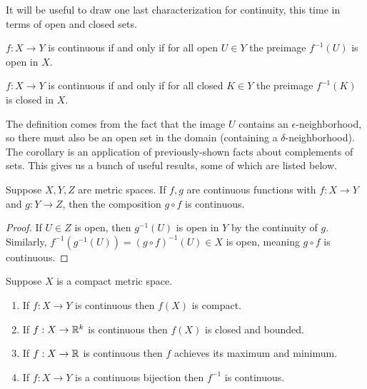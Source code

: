 \documentclass[../m131main.tex]{subfiles}
\begin{document}
It will be useful to draw one last characterization for continuity, this time in terms of open and closed sets.

\begin{definition}[]
    $f : X \to Y$ is continuous if and only if for all open $U \in Y$ the preimage $f^{-1}(U)$ is open in $X$.
\end{definition}

\begin{corollary}[]
    $f : X \to Y$ is continuous if and only if for all closed $K \in Y$ the preimage $f^{-1}(K)$ is closed in $X$.
\end{corollary}

The definition comes from the fact that the image $U$ contains an $\epsilon$-neighborhood, so there must also be an open set in the domain (containing a $\delta$-neighborhood).
The corollary is an application of previously-shown facts about complements of sets.
This gives us a bunch of useful results, some of which are listed below.

\begin{theorem}
    Suppose $X,Y,Z$ are metric spaces.
    If $f,g$ are continuous functions with $f : X \to Y$ and $g : Y \to Z$, then the composition $g \circ f$ is continuous.
\end{theorem}

\begin{proof}
    If $U \in Z$ is open, then $g^{-1}(U)$ is open in $Y$ by the continuity of $g$.
    Similarly, $f^{-1}(g^{-1}(U)) = (g \circ f)^{-1}(U) \in X$ is open, meaning $g \circ f$ is continuous.
\end{proof}

\begin{theorem}
    Suppose $X$ is a compact metric space.
    \begin{enumerate}[label=(\alph*)]
        \item If $f : X \to Y$ is continuous then $f(X)$ is compact.
        \item If $f : X \to \mathbb{R}^k$ is continuous then $f(X)$ is closed and bounded.
        \item If $f : X \to \mathbb{R}$ is continuous then $f$ achieves its maximum and minimum.
        \item If $f : X \to Y$ is a continuous bijection then $f^{-1}$ is continuous.
    \end{enumerate}
\end{theorem}
\end{document}
